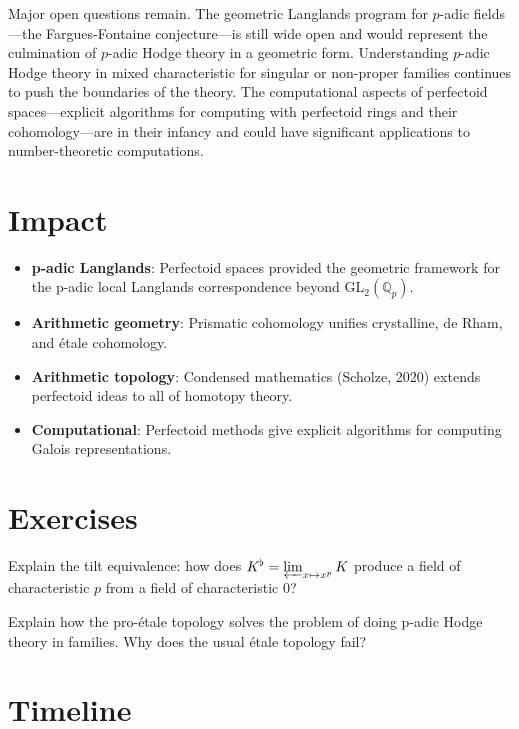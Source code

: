 Major open questions remain. The geometric Langlands program for $p$-adic fields---the Fargues-Fontaine conjecture---is still wide open and would represent the culmination of $p$-adic Hodge theory in a geometric form. Understanding $p$-adic Hodge theory in mixed characteristic for singular or non-proper families continues to push the boundaries of the theory. The computational aspects of perfectoid spaces---explicit algorithms for computing with perfectoid rings and their cohomology---are in their infancy and could have significant applications to number-theoretic computations.

\section{Impact}
\begin{itemize}
\item \textbf{p-adic Langlands}: Perfectoid spaces provided the geometric framework for the p-adic local Langlands correspondence beyond $\text{GL}_2(\mathbb{Q}_p)$.
\item \textbf{Arithmetic geometry}: Prismatic cohomology unifies crystalline, de Rham, and \'etale cohomology.
\item \textbf{Arithmetic topology}: Condensed mathematics (Scholze, 2020) extends perfectoid ideas to all of homotopy theory.
\item \textbf{Computational}: Perfectoid methods give explicit algorithms for computing Galois representations.
\end{itemize}

\section{Exercises}

\begin{exercise}[Intermediate]
Explain the tilt equivalence: how does $K^\flat = \varprojlim_{x \mapsto x^p} K$ produce a field of characteristic $p$ from a field of characteristic $0$?
\end{exercise}

\begin{exercise}[Challenge]
Explain how the pro-\'etale topology solves the problem of doing p-adic Hodge theory in families. Why does the usual \'etale topology fail?
\end{exercise}

\section{Timeline}

